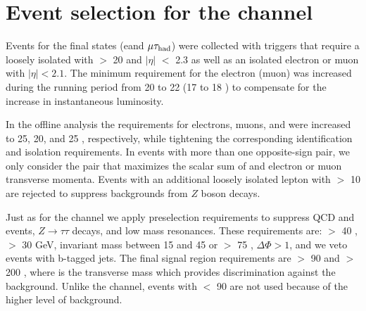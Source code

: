 \section{\texorpdfstring{Event selection for the \leptonTau channel}{Event selection for the lepton-tau channel}}
\label{sect:eleTauCuts}
Events for the \leptonTau final states (e\Tau and $\mu\tau_{\rm had}$)
were collected with triggers that require 
a loosely isolated \Tau with \PT $>$ 20 \GeV and $|\eta|$ $<$ 2.3 as well as
an isolated electron or muon with $|\eta| < 2.1$.  The minimum
\PT requirement for the electron (muon) was increased during the running
period from 20 to 22 \GeV (17 to 18 \GeV)
to compensate for the increase in instantaneous luminosity.

In the offline analysis the \PT requirements for electrons, muons, and \Tau were increased to 25, 20, and 25 \GeV, respectively, while tightening the corresponding identification and isolation requirements.
In events with more than one opposite-sign \leptonTau pair, we only consider
 the pair that maximizes the scalar sum of \Tau and electron or muon 
transverse momenta.  Events with an additional loosely isolated lepton
with \PT $>$ 10 \GeV are rejected to suppress backgrounds from $Z$ boson
decays.  

Just as for the \Tau\Tau channel we apply preselection requirements to suppress
QCD and \ttbar events, $Z \to \tau \tau$ decays, and low mass resonances.
These requirements are: \mttwo $>$ 40 \GeV, \MET $>$ 30 GeV, \leptonTau 
invariant mass between 15 and 45 \GeV or $>$ 75 \GeV, $\Delta \Phi > 1$, and we veto events with b-tagged jets.
The final signal region requirements are \mttwo $>$ 90 \GeV and 
\tauMT $>$ 200 \GeV, where \tauMT is the \Tau transverse mass which provides
discrimination against the \wjets background.  Unlike the \tauTau channel,
events with \mttwo $<$ 90 \GeV are not used because of the higher 
level of background.




